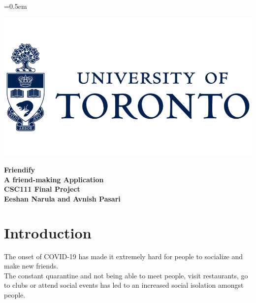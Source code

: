 \documentclass[11pt]{report}
\begin{document}
\font=0.5em%

\begin{center}
    \includegraphics[width=.5\textwidth]{Images/uoftlogo.png}


\vspace{1.5in}

\Huge{\textbf{Friendify \\ A friend-making Application}}\\[2.5in]

\LARGE{\textbf{CSC111 Final Project}}\\[0.5in]

\normalsize{\textbf{Eeshan Narula and Avnish Pasari}}\\[0.2in]
\end{center}


\newpage 


\tableofcontents
\newpage


\chapter{Introduction}

The onset of COVID-19 has made it extremely hard for people to socialize and make new friends.\\

The constant quarantine and not being able to meet people, visit restaurants, go to clubs or attend social events has led to an increased social isolation amongst people. \\
\end{document}
